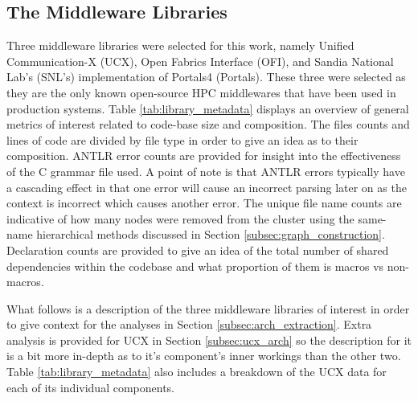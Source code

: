 \subsection{The Middleware Libraries}
\label{subsec:workloads}


Three middleware libraries were selected for this work, namely Unified Communication-X (UCX), Open Fabrics Interface (OFI), and Sandia National Lab's (SNL's) implementation of Portals4 (Portals). These three were selected as they are the only known open-source HPC middlewares that have been used in production systems. Table \ref{tab:library_metadata} displays an overview of general metrics of interest related to code-base size and composition. The files counts and lines of code are divided by file type in order to give an idea as to their composition. ANTLR error counts are provided for insight into the effectiveness of the C grammar file used. A point of note is that ANTLR errors typically have a cascading effect in that one error will cause an incorrect parsing later on as the context is incorrect which causes another error. The unique file name counts are indicative of how many nodes were removed from the cluster using the same-name hierarchical methods discussed in Section \ref{subsec:graph_construction}. Declaration counts are provided to give an idea of the total number of shared dependencies within the codebase and what proportion of them is macros vs non-macros.



What follows is a description of the three middleware libraries of interest in order to give context for the analyses in Section \ref{subsec:arch_extraction}. Extra analysis is provided for UCX in Section \ref{subsec:ucx_arch} so the description for it is a bit more in-depth as to it's component's inner workings than the other two. Table \ref{tab:library_metadata} also includes a breakdown of the UCX data for each of its individual components.

